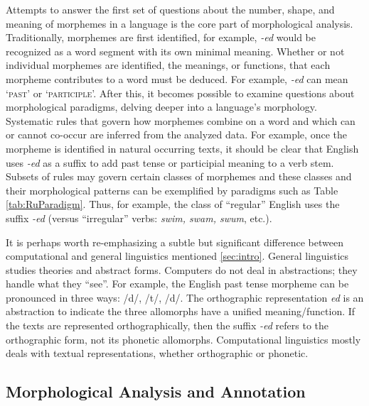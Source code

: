 \documentclass[12pt]{article}
\begin{document}
Attempts to answer the first set of questions about the number, shape, and meaning of morphemes in a language is the core part of morphological analysis. Traditionally, morphemes are first identified, for example, \textit{-ed} would be recognized as a word segment with its own minimal meaning. Whether or not individual morphemes are identified, the meanings, or functions, that each morpheme contributes to a word must be deduced. For example, \textit{-ed} can mean `\textsc{past}' or `\textsc{participle}'. After this, it becomes possible to examine questions about morphological paradigms, delving deeper into a language's morphology. Systematic rules that govern how morphemes combine on a word and which can or cannot co-occur are inferred from the analyzed data. For example, once the morpheme is identified in natural occurring texts, it should be clear that English uses \textit{-ed} as a suffix to add past tense or participial meaning to a verb stem. Subsets of rules may govern certain classes of morphemes and these classes and their morphological patterns can be exemplified by paradigms such as Table \ref{tab:RuParadigm}. Thus, for example, the class of ``regular'' English uses the suffix \textit{-ed} (versus ``irregular'' verbs: \textit{swim, swam, swum}, etc.).

It is perhaps worth re-emphasizing a subtle but significant difference between computational and general linguistics mentioned \ref{sec:intro}. General linguistics studies theories and abstract forms.  Computers do not deal in abstractions; they handle what they ``see''. For example, the English past tense morpheme can be pronounced in three ways: /d/, /t/, /{\textbari}d/. The orthographic representation \textit{ed} is an abstraction to indicate the three allomorphs have a unified meaning/function. If the texts are represented orthographically, then the suffix \textit{-ed} refers to the orthographic form, not its phonetic allomorphs. Computational linguistics mostly deals with textual representations, whether orthographic or phonetic.

\subsection{Morphological Analysis and Annotation}
\label{analysis}
\end{document}
